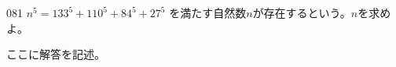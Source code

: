 \begin{prob}{081}{}{}
 $n^5=133^5+110^5+84^5+27^5$ を満たす自然数$n$が存在するという。$n$を求めよ。
\end{prob}

ここに解答を記述。